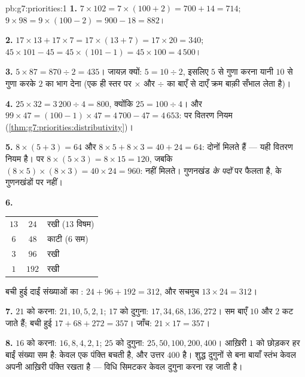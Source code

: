 \begin{solution}{pb:g7:priorities:1}
\textbf{1.} $7 \times 102 = 7 \times (100 + 2) = 700 + 14 =
714$; \quad $9 \times 98 = 9 \times (100 - 2) = 900 - 18 = 882$।

\textbf{2.} $17 \times 13 + 17 \times 7 = 17 \times (13 + 7) =
17 \times 20 = 340$; \quad $45 \times 101 - 45 = 45 \times (101
- 1) = 45 \times 100 = 4\,500$।

\textbf{3.} $5 \times 87 = 870 \div 2 = 435$। जायज़ क्यों:
$5 = 10 \div 2$, इसलिए $5$ से गुणा करना यानी $10$ से गुणा करके
$2$ का भाग देना (एक ही स्तर पर $\times$ और $\div$ का बाएँ से
दाएँ क्रम बाक़ी सँभाल लेता है)।

\textbf{4.} $25 \times 32 = 3\,200 \div 4 = 800$, क्योंकि
$25 = 100 \div 4$। और
$99 \times 47 = (100 - 1) \times 47 = 4\,700 - 47 = 4\,653$:
 पर वितरण नियम
(\cref{thm:g7:priorities:distributivity})।

\textbf{5.} $8 \times (5 + 3) = 64$ और $8 \times 5 + 8 \times 3
= 40 + 24 = 64$: दोनों मिलते हैं --- यही वितरण नियम है। पर
$8 \times (5 \times 3) = 8 \times 15 = 120$, जबकि
$(8 \times 5) \times (8 \times 3) = 40 \times 24 = 960$: नहीं
मिलते। गुणनखंड \emph{ के पदों} पर फैलता है,  के
गुणनखंडों पर नहीं।

\textbf{6.}
\begin{center}
\renewcommand{\arraystretch}{1.15}
\begin{tabular}{ccl}
$13$ & $24$ & रखी ($13$ विषम) \\
$6$ & $48$ & काटी ($6$ सम) \\
$3$ & $96$ & रखी \\
$1$ & $192$ & रखी \\
\end{tabular}
\end{center}
बची हुई दाईं संख्याओं का : $24 + 96 + 192 = 312$, और
सचमुच $13 \times 24 = 312$।

\textbf{7.} $21$ को  करना: $21, 10, 5, 2, 1$; $17$ को दुगुना:
$17, 34, 68, 136, 272$। सम बाएँ $10$ और $2$ कट जाते हैं;
बची हुई $17 + 68 + 272 = 357$। जाँच:
$21 \times 17 = 357$।

\textbf{8.} $16$ को  करना: $16, 8, 4, 2, 1$; $25$ को दुगुना:
$25, 50, 100, 200, 400$। आख़िरी $1$ को छोड़कर हर बाईं संख्या
सम है: केवल एक पंक्ति बचती है, और उत्तर $400$ है। शुद्ध दुगुनों
से बना बायाँ स्तंभ केवल अपनी आख़िरी पंक्ति रखता है --- विधि
सिमटकर केवल दुगुना करना रह जाती है।


\end{solution}
